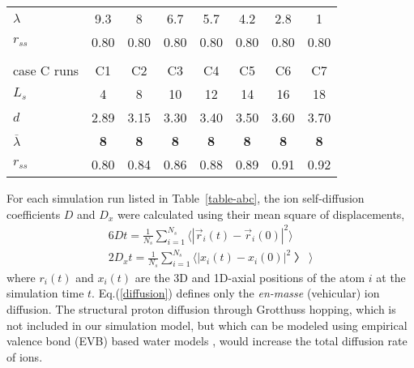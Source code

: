 \documentclass[3p,english,preprint]{elsarticle}
\newcommand{\mage}[1]{\textcolor{black}{#1}}
\begin{document}
\begin{table}[!ht]
\begin{center}
\begin{tabular}[t]{lccccccc}
$\lambda $  & 9.3 & 8 & 6.7 & 5.7  & 4.2 & 2.8 & 1   \\
$r_{ss}$  & 0.80 & 0.80 & 0.80  & 0.80   & 0.80  & 0.80 & 0.80   \\
$ $  &     &       &       &        &       &      &  \\
\hline %
case C runs            & C1  & C2   &  C3 & C4 & C5 & C6 & C7  \\ 
\hline %
$L_s$         & 4    & 8    & 10   & 12  & 14  & 16   & 18  \\
$d$       & 2.89   & 3.15 & 3.30   & 3.40  & 3.50  & 3.60   & 3.70   \\
{\bf $ \overline \lambda $ } & {\bf 8} & {\bf 8} & {\bf 8} & {\bf 8 } & {\bf 8} & {\bf 8} &  {\bf 8 }  \\
$r_{ss}$   & 0.80    & 0.84  & 0.86  & 0.88 & 0.89 & 0.91  & 0.92  \\
\hline %
\hline %
\end{tabular}
\end{center}
\end{table}


 For each simulation run listed in Table~\ref{table-abc}, 
the ion  self-diffusion coefficients $D$  and $D_x$  were calculated using 
 their mean square of displacements, 
\begin{eqnarray}
6 D t   = \frac{1}{N_s} \displaystyle\sum_{i=1}^{N_s} \langle  |\vec r_i(t) - \vec r_i(0)|^2 \rangle \nonumber \\
2 D_x t = \frac{1}{N_s} \displaystyle\sum_{i=1}^{N_s}  \langle |x_i(t) - x_i(0)|^2 〉\rangle 
\label{diffusion}
\end{eqnarray}
where $r_i(t)$ and $x_i(t)$ are the 3D and 1D-axial positions of 
the atom $i$ at the simulation time $t$. 
Eq.(\ref{diffusion}) defines only the {\it en-masse} (vehicular) ion diffusion. 
The structural proton diffusion through  Grotthuss hopping,
which is not included in our simulation model, but which  can  be modeled using
  empirical valence bond (EVB) based water models \cite{spohr-2002,walbran-2001,evb-model},
would increase the total diffusion rate of ions.
\end{document}
